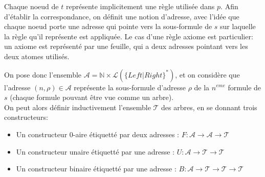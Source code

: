 \documentclass{article}
\begin{document}
Chaque noeud de $t$ représente implicitement une règle utilisée dans $p$. Afin d'établir la correspondance, on définit une notion d'adresse, avec l'idée que chaque noeud porte une adresse qui pointe vers la sous-formule de $s$ sur laquelle la règle qu'il représente est appliquée. Le cas d'une règle axiome est particulier: un axiome est représenté par une feuille, qui a deux adresses pointant vers les deux atomes utilisés.

On pose donc l'ensemble $\mathcal{A} = \mathbb{N} \times \mathcal{L} ( \{ Left | Right\}^{*} )$, et on considère que l'adresse $(n, \rho) \in \mathcal{A}$ représente la sous-formule d'adresse $\rho$ de la $n^{eme}$ formule de $s$ (chaque formule pouvant être vue comme un arbre).
\\

On peut alors définir inductivement l'ensemble $\mathcal{T}$ des arbres, en se donnant trois constructeurs:
\begin{itemize}
  \item Un constructeur 0-aire étiquetté par deux adresses : $F: \mathcal{A} \rightarrow \mathcal{A} \rightarrow \mathcal{T}$
  \item Un constructeur unaire étiquetté par une adresse : $U: \mathcal{A} \rightarrow \mathcal{T} \rightarrow \mathcal{T}$
  \item Un constructeur binaire étiquetté par une adresse : $B: \mathcal{A} \rightarrow \mathcal{T} \rightarrow \mathcal{T} \rightarrow \mathcal{T}$
\end{itemize}
\end{document}
